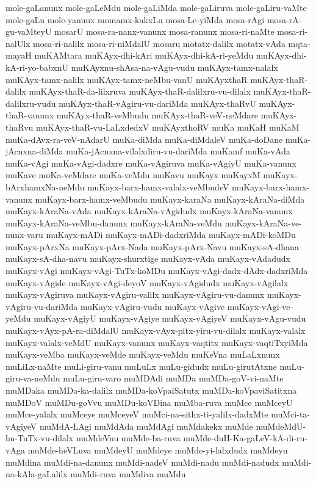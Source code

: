 {mole-gaLanunx
mole-gaLeMdu
mole-gaLiMda
mole-gaLiruva
mole-gaLiru-vaMte
mole-gaLu
mole-yanunx
momamx-kakxLu
mosa-Le-yiMda
mosa-rAgi
mosa-rA-gu-vaMteyU
mosarU
mosa-ra-nanx-vanunx
mosa-ranunx
mosa-ri-naMte
mosa-ri-nalUlx
mosa-ri-nalilx
mosa-ri-niMdalU
mosaru
motatx-dalilx
motatx-vAda
mqta-mayaH
muKAMtara
muKAyx-dhi-kAri
muKAyx-dhi-kA-ri-yeMdu
muKAyx-dhi-kA-ri-yo-babxnU
muKAyxnu-shAsa-na-vAgu-vudu
muKAyx-tamx-nalalx
muKAyx-tamx-nalilx
muKAyx-tamx-neMbu-vanU
muKAyxthaR
muKAyx-thaR-dalilx
muKAyx-thaR-da-lilxruva
muKAyx-thaR-dalilxru-vu-dilalx
muKAyx-thaR-dalilxru-vudu
muKAyx-thaR-vAgiru-vu-dariMda
muKAyx-thaRvU
muKAyx-thaR-vanunx
muKAyx-thaR-veMbudu
muKAyx-thaR-veV-neMdare
muKAyx-thaRvu
muKAyx-thaR-vu-LaLxdedxV
muKAyxthoRV
muKa
muKaH
muKaM
muKa-dAvx-ra-veV-nAdarU
muKa-diMda
muKa-diMdaleV
muKa-doDane
muKa-jAcnxna-diMda
muKa-jAcnxna-vilalxdiru-vu-dariMda
muKamf
muKa-vAda
muKa-vAgi
muKa-vAgi-dadxre
muKa-vAgiruva
muKa-vAgiyU
muKa-vanunx
muKave
muKa-veMdare
muKa-veMdu
muKavu
muKayx
muKayxM
muKayx-bArxhamxNa-neMdu
muKayx-barx-hamx-valalx-veMbudeV
muKayx-barx-hamx-vanunx
muKayx-barx-hamx-veMbudu
muKayx-karaNa
muKayx-kAraNa-diMda
muKayx-kAraNa-vAda
muKayx-kAraNa-vAgidudx
muKayx-kAraNa-vanunx
muKayx-kAraNa-veMbu-danunx
muKayx-kAraNa-veMdu
muKayx-kAraNa-ve-nunx-varu
muKayx-mADi
muKayx-mADi-dadxriMda
muKayx-mADi-koMDu
muKayx-pArxNa
muKayx-pArx-Nada
muKayx-pArx-Navu
muKayx-sA-dhana
muKayx-sA-dha-navu
muKayx-shurxtige
muKayx-vAda
muKayx-vAdadudx
muKayx-vAgi
muKayx-vAgi-TuTx-koMDu
muKayx-vAgi-dadx-dAdx-dadxriMda
muKayx-vAgide
muKayx-vAgi-deyoV
muKayx-vAgidudx
muKayx-vAgilalx
muKayx-vAgiruva
muKayx-vAgiru-valilx
muKayx-vAgiru-vu-danunx
muKayx-vAgiru-vu-dariMda
muKayx-vAgiru-vudu
muKayx-vAgive
muKayx-vAgi-ve-yeMdu
muKayx-vAgiyU
muKayx-vAgiye
muKayx-vAgiyeV
muKayx-vAgu-vudu
muKayx-vAyx-pA-ra-diMdalU
muKayx-vAyx-pitx-yiru-vu-dilalx
muKayx-valalx
muKayx-valalx-veMdU
muKayx-vanunx
muKayx-vaqtitx
muKayx-vaqtiTxyiMda
muKayx-veMba
muKayx-veMde
muKayx-veMdu
muKeVna
muLaLxnunx
muLiLx-naMte
muLi-giru-vanu
muLuLx
muLu-gidudx
muLu-girutAtxne
muLu-giru-va-neMdu
muLu-giru-varo
muMDAdi
muMDa
muMDa-goV-vi-naMte
muMDaka
muMDa-ka-dalilx
muMDa-koVpaiSatutx
muMDa-koVpaviSatitxna
muMDoV
muMDu-goVvu
muMDu-koVDina
muMba-ruva
muMce
muMceyU
muMce-yalalx
muMceye
muMceyeV
muMci-na-sithx-ti-yalilx-dadxMte
muMci-ta-vAgiyeV
muMdA-LAgi
muMdAda
muMdAgi
muMdakekx
muMde
muMdeMdU-hu-TuTx-vu-dilalx
muMdeVnu
muMde-ba-ruva
muMde-duH-Ka-gaLeV-kA-di-ru-vAga
muMde-heVLuva
muMdeyU
muMdeye
muMde-yi-lalxdudx
muMdeyu
muMdina
muMdi-na-danunx
muMdi-nadeV
muMdi-nadu
muMdi-nadudx
muMdi-na-kAla-gaLalilx
muMdi-ruva
muMdiva
muMdu
}
